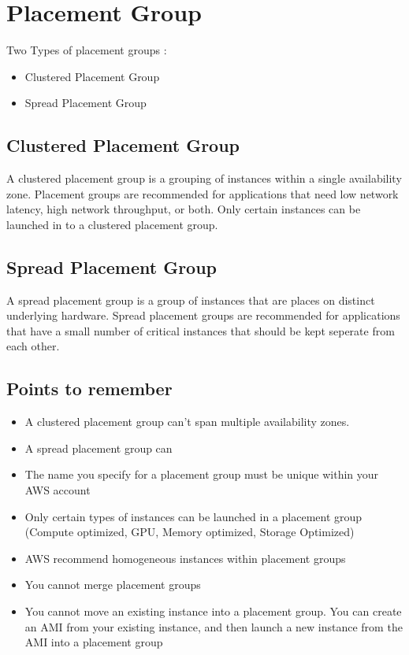 \documentclass{article}
\begin{document}
\section{Placement Group}
Two Types of placement groups :
\begin{itemize}
\item
Clustered Placement Group

\item
Spread Placement Group
\end{itemize}

\subsection{Clustered Placement Group}
A clustered placement group is a grouping of instances within a single availability zone. Placement groups are recommended for applications that need low network latency, high network throughput, or both. Only certain instances can be launched in to a clustered placement group.

\subsection{Spread Placement Group}
A spread placement group is a group of instances that are places on distinct underlying hardware. Spread placement groups are recommended for applications that have a small number of critical instances that should be kept seperate from each other.

\subsection{Points to remember}
\begin{itemize}
\item
A clustered placement group can't span multiple availability zones.

\item
A spread placement group can

\item
The name you specify for a placement group must be unique within your AWS account

\item
Only certain types of instances can be launched in a placement group (Compute optimized, GPU, Memory optimized, Storage Optimized)

\item
AWS recommend homogeneous instances within placement groups

\item
You cannot merge placement groups

\item
You cannot move an existing instance into a placement group. You can create an AMI from your existing instance, and then launch a new instance from the AMI into a placement group
\end{itemize}
\end{document}
